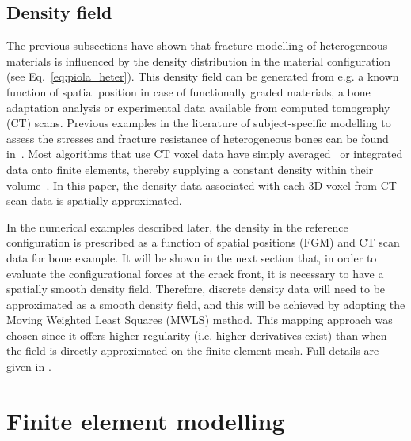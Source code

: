 \documentclass[onecolumn]{svjour3}
\begin{document}
\subsection{Density field}
\label{sec:dens_mapping}
The previous subsections have shown that  fracture modelling of heterogeneous materials is influenced by the density distribution in the material configuration (see Eq.~\ref{eq:piola_heter}). This density field can be generated from e.g.  a known function of spatial position in case of functionally graded materials, a bone adaptation analysis \cite{kuhl2003theory} or experimental data available from computed tomography (CT) scans. Previous examples in the literature of subject-specific modelling to assess the stresses and fracture resistance of heterogeneous bones can be found in~\cite{poelert2013patient,Helgason2008b,yosibash2010predicting}. Most algorithms that use CT voxel data have simply averaged~\cite{zannoni1999material} or integrated data onto finite elements, thereby supplying a constant density within their volume~\cite{taddei2007material, schileo2008subject}. In this paper, the density data associated with each 3D voxel from CT scan data is spatially approximated. 

In the numerical examples described later, the density in the reference configuration is prescribed as a function of spatial positions (FGM) and CT scan data for bone example. It will be shown in the next section that, in order to evaluate the configurational forces at the crack front, it is necessary to have a spatially smooth density field. Therefore, discrete density data will need to be approximated as a smooth density field, and this will be achieved by adopting the Moving Weighted Least Squares (MWLS) method. This mapping approach was chosen since it offers higher regularity (i.e. higher derivatives exist) than when the field is
directly approximated on the finite element mesh. Full details are given in \cite{karol_lewandowski_moving_2019}.  %
% 
\section{Finite element modelling} \label{sec:fem_modelling}
% 
\end{document}
